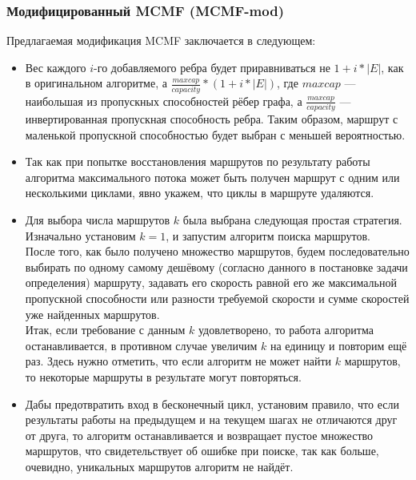 \documentclass[a4paper]{article}
\begin{document}
\subsubsection{Модифицированный MCMF (MCMF-mod)} \label{mcmfmod}
Предлагаемая модификация MCMF заключается в следующем:
\begin{itemize}
\item Вес каждого $i$-го добавляемого ребра будет приравниваться не $1+i*|E|$, как в оригинальном алгоритме, а $\frac{maxcap}{capacity} * (1+i*|E|)$, где $maxcap$ --- наибольшая из пропускных способностей рёбер графа, а $\frac{maxcap}{capacity}$  --- инвертированная пропускная способность ребра. Таким образом, маршрут с маленькой пропускной способностью будет выбран с меньшей вероятностью.
\item Так как при попытке восстановления маршрутов по результату работы алгоритма максимального потока может быть получен маршрут с одним или несколькими циклами, явно укажем, что циклы в маршруте удаляются.
\item Для выбора числа маршрутов $k$ была выбрана следующая простая стратегия. Изначально установим $k=1$, и запустим алгоритм поиска маршрутов.\\
После того, как было получено множество маршрутов, будем последовательно выбирать по одному самому дешёвому (согласно данного в постановке задачи определения) маршруту, задавать его скорость равной его же максимальной пропускной способности или разности требуемой скорости и сумме скоростей уже найденных маршрутов.\\
Итак, если требование с данным $k$ удовлетворено, то работа алгоритма останавливается, в противном случае увеличим $k$ на единицу и повторим ещё раз.
Здесь нужно отметить, что если алгоритм не может найти $k$ маршрутов, то некоторые маршруты в результате могут повторяться.
\item Дабы предотвратить вход в бесконечный цикл, установим правило, что если результаты работы на предыдущем и на текущем шагах не отличаются друг от друга, то алгоритм останавливается и возвращает пустое множество маршрутов, что свидетельствует об ошибке при поиске, так как больше, очевидно, уникальных маршрутов алгоритм не найдёт.
\end{itemize}
\end{document}
